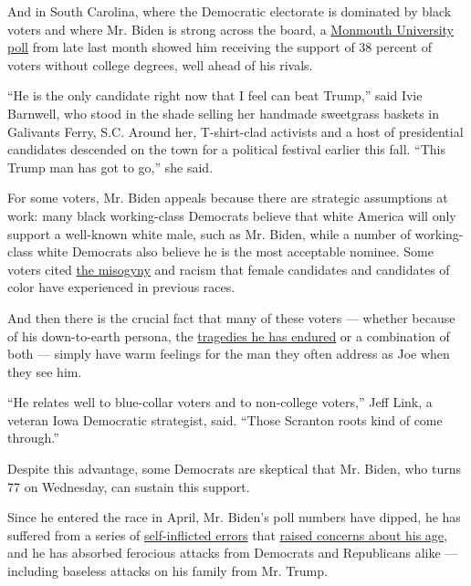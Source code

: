 And in South Carolina, where the Democratic electorate is dominated by
black voters and where Mr. Biden is strong across the board, a
\href{https://www.monmouth.edu/polling-institute/documents/monmouthpoll_sc_102319.pdf/}{Monmouth
University poll} from late last month showed him receiving the support
of 38 percent of voters without college degrees, well ahead of his
rivals.

``He is the only candidate right now that I feel can beat Trump,'' said
Ivie Barnwell, who stood in the shade selling her handmade sweetgrass
baskets in Galivants Ferry, S.C. Around her, T-shirt-clad activists and
a host of presidential candidates descended on the town for a political
festival earlier this fall. ``This Trump man has got to go,'' she said.

For some voters, Mr. Biden appeals because there are strategic
assumptions at work: many black working-class Democrats believe that
white America will only support a well-known white male, such as Mr.
Biden, while a number of working-class white Democrats also believe he
is the most acceptable nominee. Some voters cited
\href{https://www.nytimes3xbfgragh.onion/2019/07/03/us/politics/women-presidential-candidates-2020.html}{the
misogyny} and racism that female candidates and candidates of color have
experienced in previous races.

And then there is the crucial fact that many of these voters --- whether
because of his down-to-earth persona, the
\href{https://www.nytimes3xbfgragh.onion/2019/05/30/us/politics/joe-biden-beau-biden-death.html}{tragedies
he has endured} or a combination of both --- simply have warm feelings
for the man they often address as Joe when they see him.

``He relates well to blue-collar voters and to non-college voters,''
Jeff Link, a veteran Iowa Democratic strategist, said. ``Those Scranton
roots kind of come through.''

Despite this advantage, some Democrats are skeptical that Mr. Biden, who
turns 77 on Wednesday, can sustain this support.

Since he entered the race in April, Mr. Biden's poll numbers have
dipped, he has suffered from a series of
\href{https://www.nytimes3xbfgragh.onion/2019/08/12/us/politics/joe-biden-gaffes.html}{self-inflicted
errors} that
\href{https://www.nytimes3xbfgragh.onion/2019/07/29/us/politics/joe-biden-age.html}{raised
concerns about his age}, and he has absorbed ferocious attacks from
Democrats and Republicans alike --- including baseless attacks on his
family from Mr. Trump.

